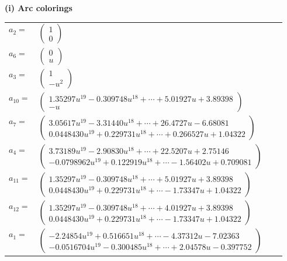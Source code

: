 \documentclass[1p]{elsarticle_modified}
\theoremstyle{definition}
\begin{document}
\flushleft \textbf{(i) Arc colorings}\\
\begin{tabular}{m{7pt} m{180pt} m{7pt} m{180pt} }
\flushright $a_{2}=$&$\begin{pmatrix}1\\0\end{pmatrix}$ \\
\flushright $a_{6}=$&$\begin{pmatrix}0\\u\end{pmatrix}$ \\
\flushright $a_{3}=$&$\begin{pmatrix}1\\- u^2\end{pmatrix}$ \\
\flushright $a_{10}=$&$\begin{pmatrix}1.35297 u^{19}-0.309748 u^{18}+\cdots+5.01927 u+3.89398\\- u\end{pmatrix}$ \\
\flushright $a_{7}=$&$\begin{pmatrix}3.05617 u^{19}-3.31440 u^{18}+\cdots+26.4727 u-6.68081\\0.0448430 u^{19}+0.229731 u^{18}+\cdots+0.266527 u+1.04322\end{pmatrix}$ \\
\flushright $a_{4}=$&$\begin{pmatrix}3.73189 u^{19}-2.90830 u^{18}+\cdots+22.5207 u+2.75146\\-0.0798962 u^{19}+0.122919 u^{18}+\cdots-1.56402 u+0.709081\end{pmatrix}$ \\
\flushright $a_{11}=$&$\begin{pmatrix}1.35297 u^{19}-0.309748 u^{18}+\cdots+5.01927 u+3.89398\\0.0448430 u^{19}+0.229731 u^{18}+\cdots-1.73347 u+1.04322\end{pmatrix}$ \\
\flushright $a_{12}=$&$\begin{pmatrix}1.35297 u^{19}-0.309748 u^{18}+\cdots+4.01927 u+3.89398\\0.0448430 u^{19}+0.229731 u^{18}+\cdots-1.73347 u+1.04322\end{pmatrix}$ \\
\flushright $a_{1}=$&$\begin{pmatrix}-2.24854 u^{19}+0.516651 u^{18}+\cdots-4.37312 u-7.02363\\-0.0516704 u^{19}-0.300485 u^{18}+\cdots+2.04578 u-0.397752\end{pmatrix}$ \\

\end{tabular}
\end{document}
